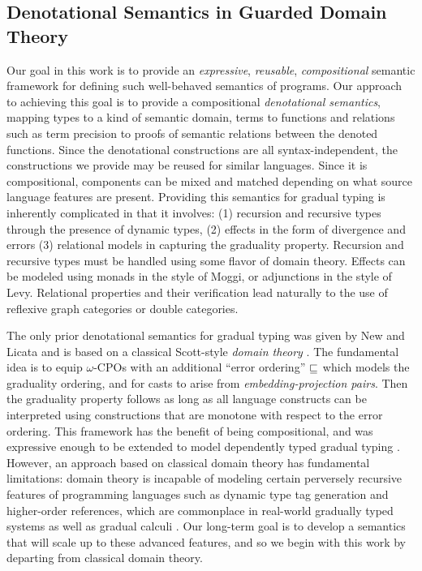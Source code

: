 \subsection{Denotational Semantics in Guarded Domain Theory}

Our goal in this work is to provide an \emph{expressive},
\emph{reusable}, \emph{compositional} semantic framework for defining
such well-behaved semantics of programs.
%
Our approach to achieving this goal is to provide a compositional
\emph{denotational semantics}, mapping types to a kind of semantic
domain, terms to functions and relations such as term precision to
proofs of semantic relations between the denoted functions.
%
Since the denotational constructions are all syntax-independent, the
constructions we provide may be reused for similar languages. Since it
is compositional, components can be mixed and matched depending on
what source language features are present.
%
Providing this semantics for gradual typing is inherently complicated
in that it involves: (1) recursion and recursive types through the
presence of dynamic types, (2) effects in the form of divergence and
errors (3) relational models in capturing the graduality
property. Recursion and recursive types must be handled using some
flavor of domain theory. Effects can be modeled using monads in the
style of Moggi, or adjunctions in the style of Levy. Relational
properties and their verification lead naturally to the use of
reflexive graph categories or double categories.

The only prior denotational semantics for gradual typing was given by
New and Licata and is based on a classical Scott-style \emph{domain
theory} \cite{new-licata18}. The fundamental idea is to equip
$\omega$-CPOs with an additional ``error ordering'' $\sqsubseteq$ which
models the graduality ordering, and for casts to arise from
\emph{embedding-projection pairs}. Then the graduality property
follows as long as all language constructs can be interpreted using
constructions that are monotone with respect to the error ordering.
%
This framework has the benefit of being compositional, and was
expressive enough to be extended to model dependently typed gradual
typing \cite{10.1145/3495528}.
%
However, an approach based on classical domain theory has fundamental
limitations: domain theory is incapable of modeling certain perversely
recursive features of programming languages such as dynamic type tag
generation and higher-order references, which are commonplace in
real-world gradually typed systems as well as gradual calculi
\cite{examples-of-gradual-stuff}. Our long-term goal is to develop a
semantics that will scale up to these advanced features, and so we
begin with this work by departing from classical domain theory.

